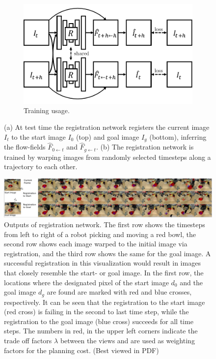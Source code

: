 \begin{figure}[t!]
\begin{subfigure}[b]{0.55\linewidth}
		\centering
		\includegraphics[width=\linewidth,trim={0 3mm 0 3mm},clip]{images_rfr/registration_train.pdf}
		\caption{\small{Training usage.}}
		\label{fig:discrete}
	\end{subfigure}
	\vspace{-1mm}
	\caption{\small{(a) At test time the registration network registers the current image $I_t$ to the start image $I_0$ (top) and goal image $I_g$ (bottom), inferring the flow-fields $\hat{F}_{0 \leftarrow t}$ and $\hat{F}_{g \leftarrow t}$. (b) The registration network is trained by warping images from randomly selected timesteps along a trajectory to each other.
	}}
	\label{fig:registration_arch}
\end{figure}

\begin{figure}
	\centering
	\vspace{-0.1in}	\includegraphics[width=1\linewidth]{images_rfr/reg_over_time.png}
	\caption{\small{Outputs of registration network. The first row shows the timesteps from left to right of a robot picking and moving a red bowl, the second row shows each image warped to the initial image via registration, and the third row shows the same for the goal image. A successful registration in this visualization would result in images that closely resemble the start- or goal image. In the first row, the locations where the designated pixel of the start image $d_0$ and the goal image $d_g$ are found are marked with red and blue crosses, respectively. It can be seen that the registration to the start image (red cross) is failing in the second to last time step, while the registration to the goal image (blue cross) succeeds for all time steps. The numbers in red, in the upper left corners indicate the trade off factors $\lambda$ between the views and are used as weighting factors for the planning cost. (Best viewed in PDF)}}
	\label{fig:tracking_overtime}
	\vspace{-0.2in}
\end{figure}

